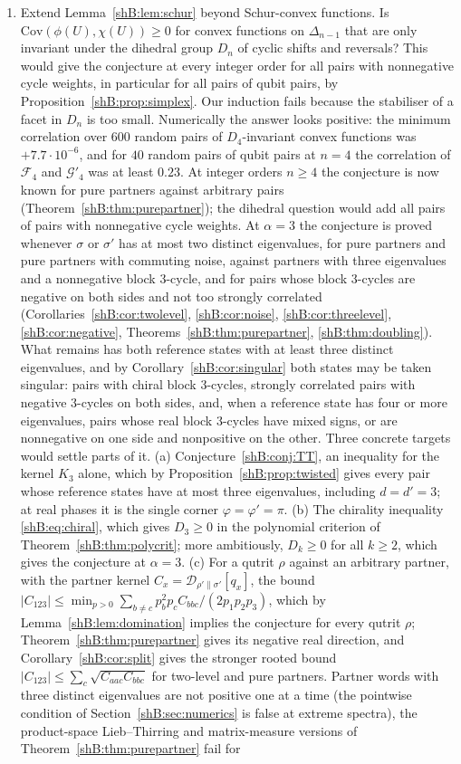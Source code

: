 \begin{enumerate}[leftmargin=1.5em]
\item Extend Lemma~\ref{shB:lem:schur} beyond Schur-convex functions. Is $\mathrm{Cov}(\phi(U),\chi(U))\ge0$ for convex functions on $\Delta_{n-1}$ that are only invariant under the dihedral group $D_n$ of cyclic shifts and reversals? This would give the conjecture at every integer order for all pairs with nonnegative cycle weights, in particular for all pairs of qubit pairs, by Proposition~\ref{shB:prop:simplex}. Our induction fails because the stabiliser of a facet in $D_n$ is too small. Numerically the answer looks positive: the minimum correlation over $600$ random pairs of $D_4$-invariant convex functions was $+7.7\cdot10^{-6}$, and for $40$ random pairs of qubit pairs at $n=4$ the correlation of $\mathcal F_4$ and $\mathcal G'_4$ was at least $0.23$. At integer orders $n\ge4$ the conjecture is now known for pure partners against arbitrary pairs (Theorem~\ref{shB:thm:purepartner}); the dihedral question would add all pairs of pairs with nonnegative cycle weights. At $\alpha=3$ the conjecture is proved whenever $\sigma$ or $\sigma'$ has at most two distinct eigenvalues, for pure partners and pure partners with commuting noise, against partners with three eigenvalues and a nonnegative block $3$-cycle, and for pairs whose block $3$-cycles are negative on both sides and not too strongly correlated (Corollaries~\ref{shB:cor:twolevel}, \ref{shB:cor:noise}, \ref{shB:cor:threelevel}, \ref{shB:cor:negative}, Theorems~\ref{shB:thm:purepartner}, \ref{shB:thm:doubling}). What remains has both reference states with at least three distinct eigenvalues, and by Corollary~\ref{shB:cor:singular} both states may be taken singular: pairs with chiral block $3$-cycles, strongly correlated pairs with negative $3$-cycles on both sides, and, when a reference state has four or more eigenvalues, pairs whose real block $3$-cycles have mixed signs, or are nonnegative on one side and nonpositive on the other. Three concrete targets would settle parts of it. (a) Conjecture~\ref{shB:conj:TT}, an inequality for the kernel $K_3$ alone, which by Proposition~\ref{shB:prop:twisted} gives every pair whose reference states have at most three eigenvalues, including $d=d'=3$; at real phases it is the single corner $\varphi=\varphi'=\pi$. (b) The chirality inequality \eqref{shB:eq:chiral}, which gives $D_3\ge0$ in the polynomial criterion of Theorem~\ref{shB:thm:polycrit}; more ambitiously, $D_k\ge0$ for all $k\ge2$, which gives the conjecture at $\alpha=3$. (c) For a qutrit $\rho$ against an arbitrary partner, with the partner kernel $C_x=\mathcal D_{\rho'\|\sigma'}[q_x]$, the bound $|C_{123}|\le\min_{p>0}\sum_{b\ne c}p_b^2p_cC_{bbc}/(2p_1p_2p_3)$, which by Lemma~\ref{shB:lem:domination} implies the conjecture for every qutrit $\rho$; Theorem~\ref{shB:thm:purepartner} gives its negative real direction, and Corollary~\ref{shB:cor:split} gives the stronger rooted bound $|C_{123}|\le\sum_c\sqrt{C_{aac}C_{bbc}}$ for two-level and pure partners. Partner words with three distinct eigenvalues are not positive one at a time (the pointwise condition of Section~\ref{shB:sec:numerics} is false at extreme spectra), the product-space Lieb--Thirring and matrix-measure versions of Theorem~\ref{shB:thm:purepartner} fail for 
\end{enumerate}
